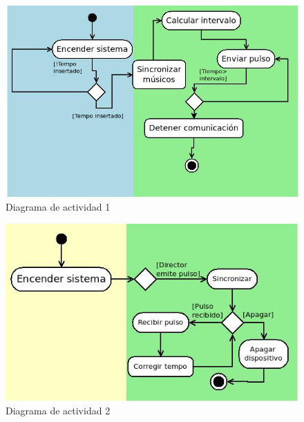 \begin{figure}[!htb]
\centering
\includegraphics[width=1\textwidth]{./imagenes/diagramaactividad1}
\caption{Diagrama de actividad 1} \label{fig:diagramaactividad1}
\end{figure}

\begin{figure}[!htb]
\centering
\includegraphics[width=1\textwidth]{./imagenes/diagramaactividad2}
\caption{Diagrama de actividad 2} \label{fig:diagramaactividad2}
\end{figure}
